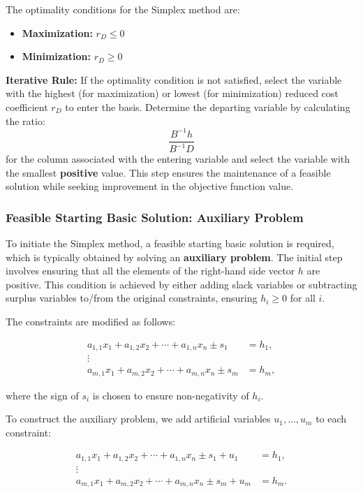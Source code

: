 \documentclass[unicode,11pt,a4paper,oneside,numbers=endperiod,openany]{scrartcl}
\begin{document}
The optimality conditions for the Simplex method are:
\begin{itemize}
    \item \textbf{Maximization:} \( r_D \leq 0 \)
    \item \textbf{Minimization:} \( r_D \geq 0 \)
\end{itemize}

\textbf{Iterative Rule:}
If the optimality condition is not satisfied, select the variable with the highest (for maximization) or lowest (for minimization) reduced cost coefficient \( r_D \) to enter the basis. Determine the departing variable by calculating the ratio:
\[
 \frac{B^{-1}h}{B^{-1}D}
\]
for the column associated with the entering variable and select the variable with the smallest \textbf{positive} value. This step ensures the maintenance of a feasible solution while seeking improvement in the objective function value.
\subsubsection{Feasible Starting Basic Solution: Auxiliary Problem}
To initiate the Simplex method, a feasible starting basic solution is required, which is typically obtained by solving an \textbf{auxiliary problem}. The initial step involves ensuring that all the elements of the right-hand side vector \(h\) are positive. This condition is achieved by either adding slack variables or subtracting surplus variables to/from the original constraints, ensuring \(h_i \geq 0\) for all \(i\).

The constraints are modified as follows:

\[
\begin{aligned}
a_{1,1}x_1 + a_{1,2}x_2 + \cdots + a_{1,n}x_n \pm s_1 &= h_1, \\
\vdots \\
a_{m,1}x_1 + a_{m,2}x_2 + \cdots + a_{m,n}x_n \pm s_m &= h_m,
\end{aligned}
\]

where the sign of \(s_i\) is chosen to ensure non-negativity of \(h_i\).

To construct the auxiliary problem, we add artificial variables \(u_1, \ldots, u_m\) to each constraint:

\[
\begin{aligned}
a_{1,1}x_1 + a_{1,2}x_2 + \cdots + a_{1,n}x_n \pm s_1 + u_1 &= h_1, \\
\vdots \\
a_{m,1}x_1 + a_{m,2}x_2 + \cdots + a_{m,n}x_n \pm s_m + u_m &= h_m.
\end{aligned}
\]
\end{document}
